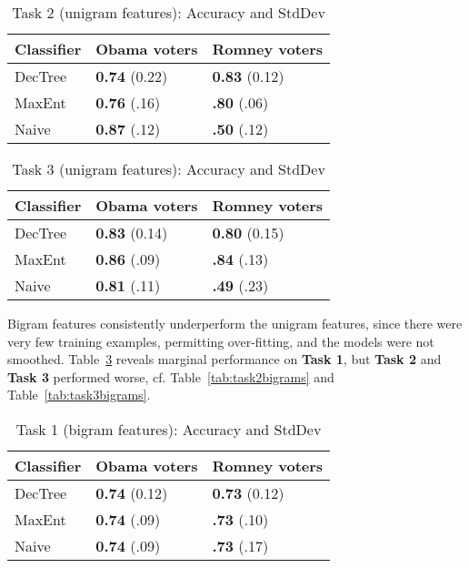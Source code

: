 \begin{table}[H]
\begin{centering}
\begin{tabular}{ l | l | l }
Classifier & Obama voters & Romney voters \\
\hline
DecTree & \textbf{0.74} (0.22) &  \textbf{0.83} (0.12) \\
MaxEnt & \textbf{0.76} (.16) &  \textbf{.80} (.06) \\
Naive & \textbf{0.87} (.12) &  \textbf{.50} (.12) \\
\end{tabular}
\caption{Task 2 (unigram features): Accuracy and StdDev}
\label{tab:task2unigrams}
\end{centering}
\end{table}

\begin{table}[H]
\begin{centering}
\begin{tabular}{ l | l | l }
Classifier & Obama voters & Romney voters \\
\hline
DecTree & \textbf{0.83} (0.14) &  \textbf{0.80} (0.15) \\
MaxEnt & \textbf{0.86} (.09) &  \textbf{.84} (.13) \\
Naive & \textbf{0.81} (.11) &  \textbf{.49} (.23) \\
\end{tabular}
\caption{Task 3 (unigram features): Accuracy and StdDev}
\label{tab:task3unigrams}
\end{centering}
\end{table}

Bigram features consistently underperform the unigram features, since there were very few training examples, permitting over-fitting, and the models were not smoothed.  Table~\ref{tab:task1bigrams} reveals marginal performance on \textbf{Task 1}, but \textbf{Task 2} and \textbf{Task 3} performed worse, cf. Table~\ref{tab:task2bigrams} and Table~\ref{tab:task3bigrams}.

\begin{table}[H]
\begin{centering}
\begin{tabular}{ l | l | l }
Classifier & Obama voters & Romney voters \\
\hline
DecTree & \textbf{0.74} (0.12) &  \textbf{0.73} (0.12) \\
MaxEnt & \textbf{0.74} (.09) &  \textbf{.73} (.10) \\
Naive & \textbf{0.74} (.09) &  \textbf{.73} (.17) \\
\end{tabular}
\caption{Task 1 (bigram features): Accuracy and StdDev}
\label{tab:task1bigrams}
\end{centering}
\end{table}

